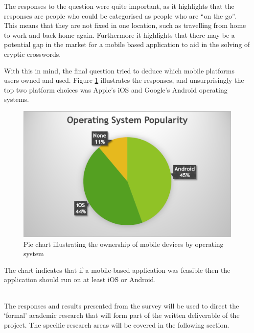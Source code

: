 The responses to the question were quite important, as it highlights that the 
responses are people who could be categorised as people who are ``on the go''. 
This means that they are not fixed in one location, such as travelling from home
to work and back home again. Furthermore it highlights that there may be a potential
gap in the market for a mobile based application to aid in the solving of 
cryptic crosswords.

With this in mind, the final question tried to deduce which mobile platforms 
users owned and used. Figure \ref{fig:survey_os} illustrates the responses, and 
unsurprisingly the top two platform choices was Apple's iOS and Google's Android
operating systems.

\begin{figure}[H]
  \centering
  \includegraphics[scale=0.9]{graphs/operating_system.png}
  \caption{Pie chart illustrating the ownership of mobile devices by operating 
          system}
  \label{fig:survey_os}
\end{figure}

The chart indicates that if a mobile-based application was feasible then the 
application should run on at least iOS or Android.

~\\

The responses and results presented from the survey will be used to direct the 
`formal' academic research that will form part of the written deliverable of the
project. The specific research areas will be covered in the following section.
